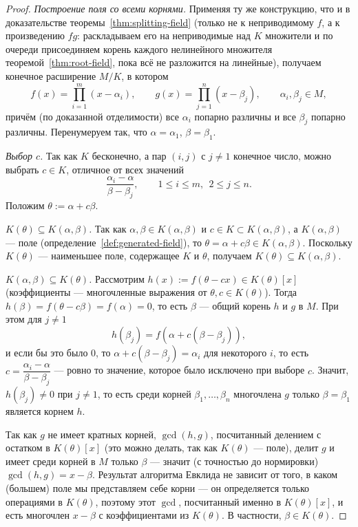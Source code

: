 \documentclass[12pt]{article}
\begin{document}
\begin{proof}
    	\emph{Построение поля со всеми корнями.} Применяя ту же конструкцию, что и в доказательстве теоремы~\ref{thm:splitting-field} (только не к неприводимому $f$, а к произведению $fg$: раскладываем его на неприводимые над $K$ множители и по очереди присоединяем корень каждого нелинейного множителя теоремой~\ref{thm:root-field}, пока всё не разложится на линейные), получаем конечное расширение $M/K$, в котором
    	\[
    	f(x) = \prod_{i=1}^m (x-\alpha_i), \qquad g(x) = \prod_{j=1}^n (x-\beta_j), \qquad \alpha_i,\beta_j \in M,
    	\]
    	причём (по доказанной отделимости) все $\alpha_i$ попарно различны и все $\beta_j$ попарно различны. Перенумеруем так, что $\alpha=\alpha_1$, $\beta=\beta_1$.
    
    	\emph{Выбор $c$.} Так как $K$ бесконечно, а пар $(i,j)$ с $j\ne 1$ конечное число, можно выбрать $c \in K$, отличное от всех значений
    	\[
    	\frac{\alpha_i-\alpha}{\beta-\beta_j}, \qquad 1\leqslant i \leqslant m,\ \ 2\leqslant j \leqslant n.
    	\]
    	Положим $\theta := \alpha+c\beta$.
    
    	\emph{$K(\theta) \subseteq K(\alpha,\beta)$.} Так как $\alpha,\beta \in K(\alpha,\beta)$ и $c \in K \subset K(\alpha,\beta)$, а $K(\alpha,\beta)$ --- поле (определение~\ref{def:generated-field}), то $\theta = \alpha+c\beta \in K(\alpha,\beta)$. Поскольку $K(\theta)$ --- наименьшее поле, содержащее $K$ и $\theta$, получаем $K(\theta)\subseteq K(\alpha,\beta)$.
    
    	\emph{$K(\alpha,\beta) \subseteq K(\theta)$.} Рассмотрим $h(x) := f(\theta-cx) \in K(\theta)[x]$ (коэффициенты --- многочленные выражения от $\theta,c \in K(\theta)$). Тогда $h(\beta) = f(\theta-c\beta) = f(\alpha) = 0$, то есть $\beta$ --- общий корень $h$ и $g$ в $M$. При этом для $j \ne 1$
    	\[
    	h(\beta_j) = f(\alpha + c(\beta-\beta_j)),
    	\]
    	и если бы это было $0$, то $\alpha+c(\beta-\beta_j)=\alpha_i$ для некоторого $i$, то есть $c = \dfrac{\alpha_i-\alpha}{\beta-\beta_j}$ --- ровно то значение, которое было исключено при выборе $c$. Значит, $h(\beta_j)\ne 0$ при $j\ne1$, то есть среди корней $\beta_1,\ldots,\beta_n$ многочлена $g$ только $\beta=\beta_1$ является корнем $h$.
    
    	Так как $g$ не имеет кратных корней, $\gcd(h,g)$, посчитанный делением с остатком в $K(\theta)[x]$ (это можно делать, так как $K(\theta)$ --- поле), делит $g$ и имеет среди корней в $M$ только $\beta$ --- значит (с точностью до нормировки) $\gcd(h,g) = x-\beta$. Результат алгоритма Евклида не зависит от того, в каком (большем) поле мы представляем себе корни --- он определяется только операциями в $K(\theta)$, поэтому этот $\gcd$, посчитанный именно в $K(\theta)[x]$, и есть многочлен $x-\beta$ с коэффициентами из $K(\theta)$. В частности, $\beta \in K(\theta)$.
    

\end{proof}
\end{document}
